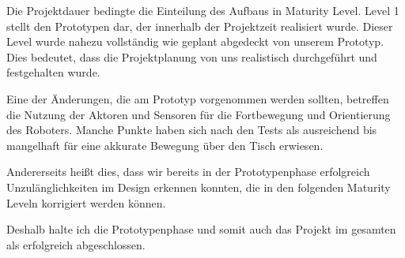 Die Projektdauer bedingte die Einteilung des Aufbaus in Maturity Level. Level 1 stellt den Prototypen dar, der innerhalb der Projektzeit realisiert wurde. Dieser Level wurde nahezu vollständig wie geplant abgedeckt von unserem Prototyp. Dies bedeutet, dass die Projektplanung von uns realistisch durchgeführt und festgehalten wurde.

Eine der Änderungen, die am Prototyp vorgenommen werden sollten, betreffen die Nutzung der Aktoren und Sensoren für die Fortbewegung und Orientierung des Roboters. Manche Punkte haben sich nach den Tests als ausreichend bis mangelhaft für eine akkurate Bewegung über den Tisch erwiesen.

Andererseits heißt dies, dass wir bereits in der Prototypenphase erfolgreich Unzulänglichkeiten im Design erkennen konnten, die in den folgenden Maturity Leveln  korrigiert werden können.

Deshalb halte ich die Prototypenphase und somit auch das Projekt im gesamten als erfolgreich abgeschlossen.
